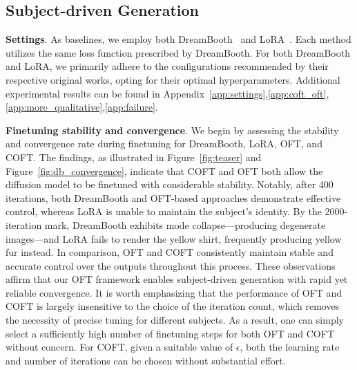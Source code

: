 \subsection{Subject-driven Generation}

\textbf{Settings}. As baselines, we employ both DreamBooth~\cite{ruiz2023dreambooth} and LoRA~\cite{hulora2022}. Each method utilizes the same loss function prescribed by DreamBooth. For both DreamBooth and LoRA, we primarily adhere to the configurations recommended by their respective original works, opting for their optimal hyperparameters. Additional experimental results can be found in Appendix~\ref{app:settings},\ref{app:coft_oft},\ref{app:more_qualitative},\ref{app:failure}.

\textbf{Finetuning stability and convergence}. We begin by assessing the stability and convergence rate during finetuning for DreamBooth, LoRA, OFT, and COFT. The findings, as illustrated in Figure~\ref{fig:teaser} and Figure~\ref{fig:db_convergence}, indicate that COFT and OFT both allow the diffusion model to be finetuned with considerable stability. Notably, after 400 iterations, both DreamBooth and OFT-based approaches demonstrate effective control, whereas LoRA is unable to maintain the subject’s identity. By the 2000-iteration mark, DreamBooth exhibits mode collapse—producing degenerate images—and LoRA fails to render the yellow shirt, frequently producing yellow fur instead. In comparison, OFT and COFT consistently maintain stable and accurate control over the outputs throughout this process. These observations affirm that our OFT framework enables subject-driven generation with rapid yet reliable convergence. It is worth emphasizing that the performance of OFT and COFT is largely insensitive to the choice of the iteration count, which removes the necessity of precise tuning for different subjects. As a result, one can simply select a sufficiently high number of finetuning steps for both OFT and COFT without concern. For COFT, given a suitable value of $\epsilon$, both the learning rate and number of iterations can be chosen without substantial effort.

